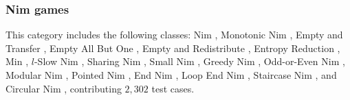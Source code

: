 \documentclass[review]{elsarticle}
\newcommand{\set}[1]{\{ #1 \}}
\begin{document}


%


\subsubsection{Nim games}
This category includes the following classes: Nim \cite{Bou1901}, Monotonic Nim \cite{AhnCCEFGGKMPS2017}, Empty and Transfer \cite{Fer1998}, Empty All But One \cite{Fer1998}, Empty and Redistribute \cite{Fer1998}, Entropy Reduction \cite{Fer1998}, Min \cite{CaiH2010}, $l$-Slow Nim \cite{AhnCCEFGGKMPS2017}, Sharing Nim \cite{Ho2016}, Small Nim \cite{BerCG2001}, Greedy Nim \cite{AlbN2004}, Odd-or-Even Nim \cite{SmiS2002}, Modular Nim \cite{GavS2004}, Pointed Nim \cite{AlbN2004}, End Nim \cite{AlbN2001}, Loop End Nim \cite{AlbN2001}, Staircase Nim \cite{Spr1937}, and Circular Nim \cite{DufH2013}, contributing $2,302$ test cases.

\end{document}
